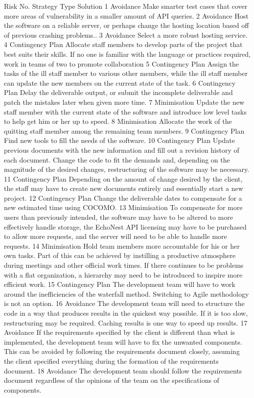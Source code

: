 \documentclass[]{article}
\begin{document}
Risk No. Strategy Type Solution 1 Avoidance Make smarter test cases that
cover more areas of vulnerability in a smaller amount of API queries. 2
Avoidance Host the software on a reliable server, or perhaps change the
hosting location based off of previous crashing problems.. 3 Avoidance
Select a more robust hosting service. 4 Contingency Plan Allocate staff
members to develop parts of the project that best suits their skills. If
no one is familiar with the language or practices required, work in
teams of two to promote collaboration 5 Contingency Plan Assign the
tasks of the ill staff member to various other members, while the ill
staff member can update the new members on the current state of the
task. 6 Contingency Plan Delay the deliverable output, or submit the
incomplete deliverable and patch the mistakes later when given more
time. 7 Minimisation Update the new staff member with the current state
of the software and introduce low level tasks to help get him or her up
to speed. 8 Minimisation Allocate the work of the quitting staff member
among the remaining team members. 9 Contingency Plan Find new tools to
fill the needs of the software. 10 Contingency Plan Update previous
documents with the new information and fill out a revision history of
each document. Change the code to fit the demands and, depending on the
magnitude of the desired changes, restructuring of the software may be
necessary. 11 Contingency Plan Depending on the amount of change desired
by the client, the staff may have to create new documents entirely and
essentially start a new project. 12 Contingency Plan Change the
deliverable dates to compensate for a new estimated time using COCOMO.
13 Minimisation To compensate for more users than previously intended,
the software may have to be altered to more effectively handle storage,
the EchoNest API licensing may have to be purchased to allow more
requests, and the server will need to be able to handle more requests.
14 Minimisation Hold team members more accountable for his or her own
tasks. Part of this can be achieved by instilling a productive
atmosphere during meetings and other official work times. If there
continues to be problems with a flat organization, a hierarchy may need
to be introduced to inspire more efficient work. 15 Contingency Plan The
development team will have to work around the inefficiencies of the
waterfall method. Switching to Agile methodology is not an option. 16
Avoidance The development team will need to structure the code in a way
that produces results in the quickest way possible. If it is too slow,
restructuring may be required. Caching results is one way to speed up
results. 17 Avoidance If the requirements specified by the client is
different than what is implemented, the development team will have to
fix the unwanted components. This can be avoided by following the
requirements document closely, assuming the client specified everything
during the formation of the requirements document. 18 Avoidance The
development team should follow the requirements document regardless of
the opinions of the team on the specifications of components.
\end{document}
